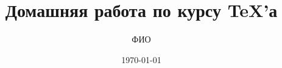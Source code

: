 \documentclass{article}
\title{\bfseries Домашняя работа \textnumero 7 по курсу \TeX'а}
\author{ФИО}
\date{\today}
\begin{document}

\pagebreak




\end{document}
